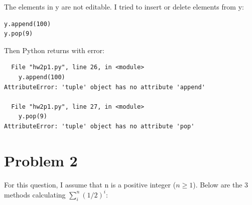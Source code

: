 \begin{itemize}
The elements in y are not editable. I tried to insert or delete elements from y:
\begin{verbatim}
y.append(100)
y.pop(9)
\end{verbatim}

Then Python returns with error:
\begin{verbatim}
  File "hw2p1.py", line 26, in <module>
    y.append(100)
AttributeError: 'tuple' object has no attribute 'append'

  File "hw2p1.py", line 27, in <module>
    y.pop(9)
AttributeError: 'tuple' object has no attribute 'pop'
\end{verbatim}

\end{itemize}

\section*{Problem 2}
For this question, I assume that n is a positive integer ($n \geq 1$). Below are the 3 methods calculating $\sum_i^n (1/2)^i$:

